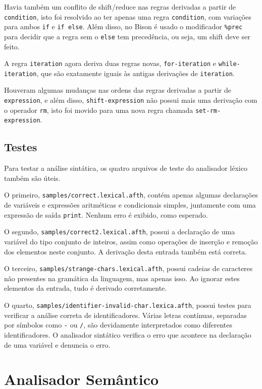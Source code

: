 \documentclass[
	article,			%
	11pt,				%
	oneside,			%
	a4paper,			%
	english,			%
	brazil,				%
	sumario=tradicional
	]{abntex2}
\begin{document}
Havia também um conflito de shift/reduce nas regras derivadas a partir de \texttt{condition}, isto foi resolvido ao ter apenas uma regra \texttt{condition}, com variações para ambos \texttt{if} e \texttt{if else}. Além disso, no Bison é usado o modificador \texttt{\%prec} para decidir que a regra sem o \texttt{else} tem precedência, ou seja, um shift deve ser feito.

A regra \texttt{iteration} agora deriva duas regras novas, \texttt{for-iteration} e 
\texttt{while-iteration}, que são exatamente iguais às antigas derivações de \texttt{iteration}.

Houveram algumas mudanças nas ordens das regras derivadas a partir de \texttt{expression}, e além disso, \texttt{shift-expression} não possui mais uma derivação com o operador \texttt{rm}, isto foi movido para uma nova regra chamada \texttt{set-rm-expression}.

\subsection{Testes}

Para testar a análise sintática, os quatro arquivos de teste do analisador léxico também são úteis.

O primeiro, \texttt{samples/correct.lexical.afth}, contém apenas
algumas declarações de variáveis e expressões aritméticas e condicionais
simples, juntamente com uma expressão de saída \texttt{print}. Nenhum erro é exibido, como esperado.

O segundo, \texttt{samples/correct2.lexical.afth}, possui a declaração
de uma variável do tipo conjunto de inteiros, assim como operações
de inserção e remoção dos elementos neste conjunto. A derivação desta entrada também está correta.

O terceiro, \texttt{samples/strange-chars.lexical.afth}, possui
cadeias de caracteres não presentes na gramática da linguagem, mas apenas isso. Ao ignorar estes elementos da entrada, tudo é derivado corretamente.

O quarto, \texttt{samples/identifier-invalid-char.lexica.afth}, possui
testes para verificar a análise correta de identificadores. Várias letras
contínuas, separadas por símbolos como \texttt{-} ou \texttt{/}, são
devidamente interpretados como diferentes identificadores. O analisador sintático verifica o erro que acontece na declaração de uma variável e denuncia o erro.

\section{Analisador Semântico}
\end{document}
